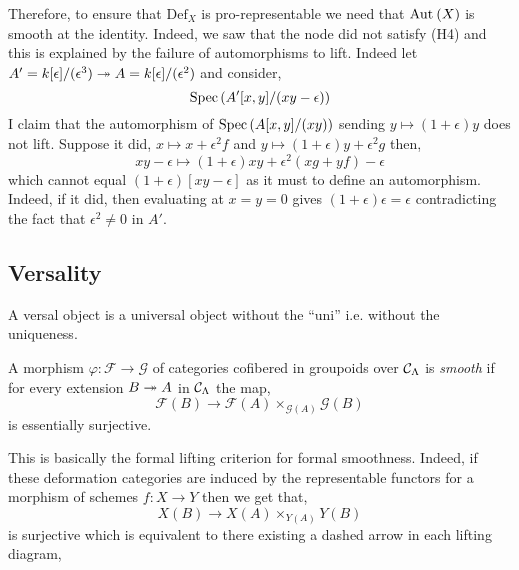 \documentclass[12pt]{article}
\newcommand{\Def}{\mathrm{Def}}
\renewcommand{\F}{\mathcal{F}}
\renewcommand{\G}{\mathcal{G}}
\begin{document}
\begin{rmk}
Therefore, to ensure that $\Def_X$ is pro-representable we need that $\mathrm{Aut}_{} \left( X \right)$ is smooth at the identity. Indeed, we saw that the node did not satisfy (H4) and this is explained by the failure of automorphisms to lift. Indeed let $A' = k[\epsilon]/(\epsilon^3) \twoheadrightarrow A = k[\epsilon]/(\epsilon^2)$ and consider,
\[ \mathrm{Spec}\left( A'[x,y]/(xy - \epsilon) \right) \]
I claim that the automorphism of $\mathrm{Spec}\left( A[x,y]/(xy) \right)$ sending $y \mapsto (1 + \epsilon) y$ does not lift. Suppose it did, $x \mapsto x + \epsilon^2 f$ and $y \mapsto (1 + \epsilon) y + \epsilon^2 g$ then,
\[ xy - \epsilon \mapsto (1 + \epsilon) xy + \epsilon^2 (x g + y f) - \epsilon \]
which cannot equal $(1 + \epsilon) [xy - \epsilon]$ as it must to define an automorphism. Indeed, if it did, then evaluating at $x = y = 0$ gives $(1 + \epsilon) \epsilon = \epsilon$ contradicting the fact that $\epsilon^2 \neq 0$ in $A'$.
\end{rmk}


\subsection{Versality}

\begin{rmk}
A versal object is a universal object without the ``uni'' i.e. without the uniqueness. 
\end{rmk}

\begin{defn}
A morphism $\varphi : \F \to \G$ of categories cofibered in groupoids over $\mathcal{C}_\Lambda$ is \textit{smooth} if for every extension $B \twoheadrightarrow A$ in $\mathcal{C}_{\Lambda}$ the map,
\[ \F(B) \to \F(A) \times_{\G(A)} \G(B) \]
is essentially surjective.
\end{defn}

\begin{rmk}
This is basically the formal lifting criterion for formal smoothness. Indeed, if these deformation categories are induced by the representable functors for a morphism of schemes $f : X \to Y$ then we get that,
\[ X(B) \to X(A) \times_{Y(A)} Y(B) \]
is surjective which is equivalent to there existing a dashed arrow in each lifting diagram,
\begin{center}
\end{center} 
\end{rmk}
\end{document}
